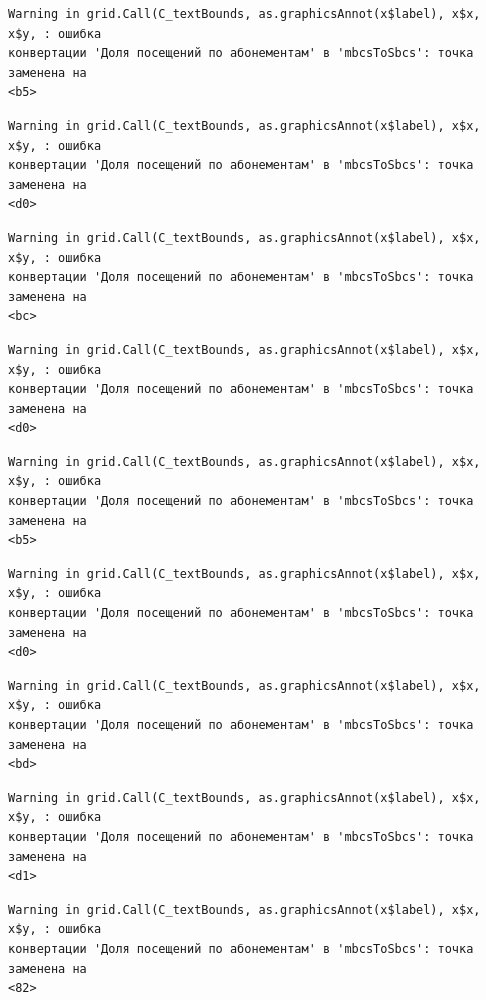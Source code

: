 \documentclass[
  letterpaper,
  DIV=11,
  numbers=noendperiod]{scrreprt}
\begin{document}
\begin{verbatim}
Warning in grid.Call(C_textBounds, as.graphicsAnnot(x$label), x$x, x$y, : ошибка
конвертации 'Доля посещений по абонементам' в 'mbcsToSbcs': точка заменена на
<b5>
\end{verbatim}

\begin{verbatim}
Warning in grid.Call(C_textBounds, as.graphicsAnnot(x$label), x$x, x$y, : ошибка
конвертации 'Доля посещений по абонементам' в 'mbcsToSbcs': точка заменена на
<d0>
\end{verbatim}

\begin{verbatim}
Warning in grid.Call(C_textBounds, as.graphicsAnnot(x$label), x$x, x$y, : ошибка
конвертации 'Доля посещений по абонементам' в 'mbcsToSbcs': точка заменена на
<bc>
\end{verbatim}

\begin{verbatim}
Warning in grid.Call(C_textBounds, as.graphicsAnnot(x$label), x$x, x$y, : ошибка
конвертации 'Доля посещений по абонементам' в 'mbcsToSbcs': точка заменена на
<d0>
\end{verbatim}

\begin{verbatim}
Warning in grid.Call(C_textBounds, as.graphicsAnnot(x$label), x$x, x$y, : ошибка
конвертации 'Доля посещений по абонементам' в 'mbcsToSbcs': точка заменена на
<b5>
\end{verbatim}

\begin{verbatim}
Warning in grid.Call(C_textBounds, as.graphicsAnnot(x$label), x$x, x$y, : ошибка
конвертации 'Доля посещений по абонементам' в 'mbcsToSbcs': точка заменена на
<d0>
\end{verbatim}

\begin{verbatim}
Warning in grid.Call(C_textBounds, as.graphicsAnnot(x$label), x$x, x$y, : ошибка
конвертации 'Доля посещений по абонементам' в 'mbcsToSbcs': точка заменена на
<bd>
\end{verbatim}

\begin{verbatim}
Warning in grid.Call(C_textBounds, as.graphicsAnnot(x$label), x$x, x$y, : ошибка
конвертации 'Доля посещений по абонементам' в 'mbcsToSbcs': точка заменена на
<d1>
\end{verbatim}

\begin{verbatim}
Warning in grid.Call(C_textBounds, as.graphicsAnnot(x$label), x$x, x$y, : ошибка
конвертации 'Доля посещений по абонементам' в 'mbcsToSbcs': точка заменена на
<82>
\end{verbatim}
\end{document}
